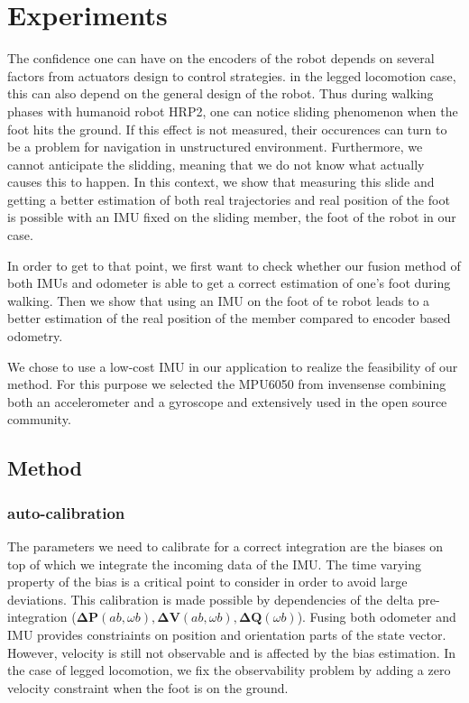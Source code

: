 
\section{Experiments} \label{sec:experiments}

The confidence one can have on the encoders of the robot depends on several factors from actuators design to control strategies. in the legged locomotion case, this can also depend on the general design of the robot.
Thus during walking phases with humanoid robot HRP2, one can notice sliding phenomenon when the foot hits the ground. If this effect is not measured, their occurences can turn to be a problem for navigation in unstructured environment. 
Furthermore, we cannot anticipate the slidding, meaning that we do not know what actually causes this to happen. 
In this context, we show that measuring this slide and getting a better estimation of both real trajectories and real position of the foot is possible with an IMU fixed on the sliding member, the foot of the robot in our case.

In order to get to that point, we first want to check whether our fusion method of both IMUs and odometer is able to get a correct estimation of one's foot during walking.
Then we show that using an IMU on the foot of te robot leads to a better estimation of the real position of the member compared to encoder based odometry.

We chose to use a low-cost IMU in our application to realize the feasibility of our method. For this purpose we selected the 
MPU6050 from invensense combining both an accelerometer and a gyroscope and extensively used in the open source community.



\subsection{Method}
\subsubsection{auto-calibration}

The parameters we need to calibrate for a correct integration are the biases on top of which we integrate the incoming data of the IMU.
The time varying property of the bias is a critical point to consider in order to avoid large deviations. This calibration is made possible
by dependencies of the delta pre-integration ($\boldsymbol{\Delta P}(ab, \omega b), \boldsymbol{\Delta V}(ab, \omega b), \boldsymbol{\Delta Q}(\omega b)$). Fusing both odometer and IMU provides constriaints on position and orientation parts of
the state vector. However, velocity is still not observable and is affected by the bias estimation. In the case of legged locomotion, we fix the observability problem by adding a zero velocity constraint when the foot is on the ground.


